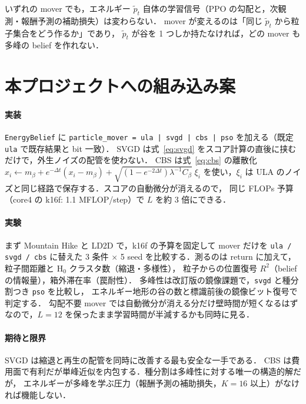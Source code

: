 \documentclass[a4paper,11pt]{article}
\newcommand{\ptil}{\tilde p_t}
\begin{document}
いずれの mover でも，エネルギー $\ptil$ 自体の学習信号（PPO の勾配と，次観測・報酬予測の補助損失）は変わらない．
mover が変えるのは「同じ $\ptil$ から粒子集合をどう作るか」であり，
$\ptil$ が谷を 1 つしか持たなければ，どの mover も多峰の belief を作れない．

\section{本プロジェクトへの組み込み案}

\paragraph{実装} \texttt{EnergyBelief} に \texttt{particle\_mover = ula | svgd | cbs | pso} を加える（既定 \texttt{ula} で既存結果と bit 一致）．
SVGD は式~\eqref{eq:svgd} をスコア計算の直後に挟むだけで，外生ノイズの配管を使わない．
CBS は式~\eqref{eq:cbs} の離散化
$x_i \leftarrow m_\beta + e^{-\Delta t}(x_i - m_\beta) + \sqrt{(1 - e^{-2\Delta t}) \lambda^{-1} C_\beta}\; \xi_i$
を使い，$\xi_i$ は ULA のノイズと同じ経路で保存する．スコアの自動微分が消えるので，
同じ FLOPs 予算（core4 の k16f: 1.1 MFLOP/step）で $L$ を約 3 倍にできる．

\paragraph{実験} まず Mountain Hike と LD2D で，k16f の予算を固定して mover だけを \texttt{ula / svgd / cbs} に替えた 3 条件
$\times$ 5 seed を比較する．測るのは return に加えて，粒子間距離と H$_0$ クラスタ数（縮退・多様性），
粒子からの位置復号 $R^2$（belief の情報量），箱外滞在率（罠耐性）．
多峰性は改訂版の鏡像課題で，\texttt{svgd} と種分割つき \texttt{pso} を比較し，
エネルギー地形の谷の数と標識前後の鏡像ビット復号で判定する．
勾配不要 mover では自動微分が消える分だけ壁時間が短くなるはずなので，$L = 12$ を保ったまま学習時間が半減するかも同時に見る．

\paragraph{期待と限界} SVGD は縮退と再生の配管を同時に改善する最も安全な一手である．
CBS は費用面で有利だが単峰近似を内包する．種分割は多峰性に対する唯一の構造的解だが，
エネルギーが多峰を学ぶ圧力（報酬予測の補助損失，$K = 16$ 以上）がなければ機能しない．
\end{document}
